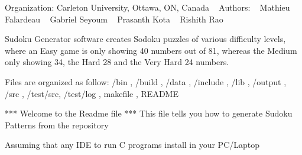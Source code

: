 Organization\+: Carleton University, Ottawa, ON, Canada ~\newline
 Authors\+: ~\newline
 Mathieu Falardeau ~\newline
 Gabriel Seyoum ~\newline
 Prasanth Kota ~\newline
 Rishith Rao ~\newline


Sudoku Generator software creates Sodoku puzzles of various difficulty levels, where an Easy game is only showing 40 numbers out of 81, whereas the Medium only showing 34, the Hard 28 and the Very Hard 24 numbers.

Files are organized as follow\+: /bin , /build , /data , /include , /lib , /output , /src , /test/src, /test/log , makefile , R\+E\+A\+D\+ME \begin{DoxyVerb}                             *** Welcome to the Readme file ***
          This file tells you how to generate Sudoku Patterns from the repository
\end{DoxyVerb}


Assuming that any I\+DE to run C programs install in your P\+C/\+Laptop


